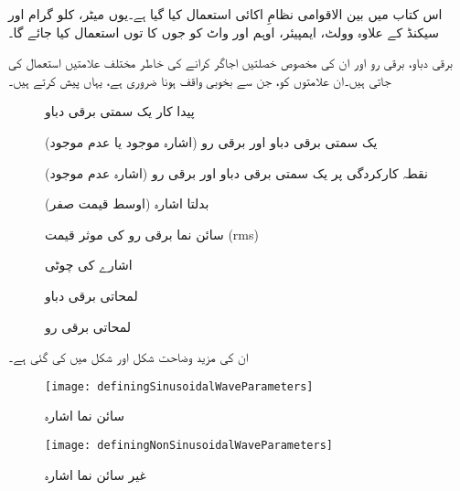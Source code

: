 
اس کتاب میں بین الاقوامی نظامِ اکائی  استعمال کیا گیا ہے۔یوں میٹر، کلو گرام اور سیکنڈ کے علاوہ وولٹ، ایمپیئر، اوہم اور واٹ کو جوں کا توں استعمال کیا جائے گا۔

برقی دباو، برقی رو اور ان کی مخصوص خصلتیں اجاگر کرانے کی خاطر مختلف علامتیں استعمال کی جاتی ہیں۔ان علامتوں کو، جن سے بخوبی واقف ہونا ضروری ہے، یہاں پیش کرتے ہیں۔

\begin{description}
\item
[]  پیدا کار یک سمتی برقی دباو
\item
[] یک سمتی برقی دباو اور برقی رو  (اشارہ موجود یا عدم موجود)
\item
[]  نقطہ کارکردگی پر یک سمتی برقی دباو اور برقی رو (اشارہ عدم موجود)
\item
[] بدلتا اشارہ (اوسط قیمت صفر)
\item
[ ]  سائن نما برقی رو کی موثر قیمت (rms)
\item
[ ]  اشارے کی چوٹی
\item
[ ] لمحاتی برقی دباو
\item
[ ] لمحاتی برقی رو
\end{description}

\FloatBarrier

ان کی مزید وضاحت شکل   اور شکل  میں کی گئی ہے۔

\begin{figure}
\centering
\texttt{[image: definingSinusoidalWaveParameters]}
\caption{سائن نما اشارہ}
\label{شکل_سائن_نما_اشارے_کے_جزو}
\end{figure}

\begin{figure}
\centering
\texttt{[image: definingNonSinusoidalWaveParameters]}
\caption{غیر سائن نما اشارہ}
\label{شکل_غیر_سائن_نما_اشارے_کے_جزو}
\end{figure}

\FloatBarrier



